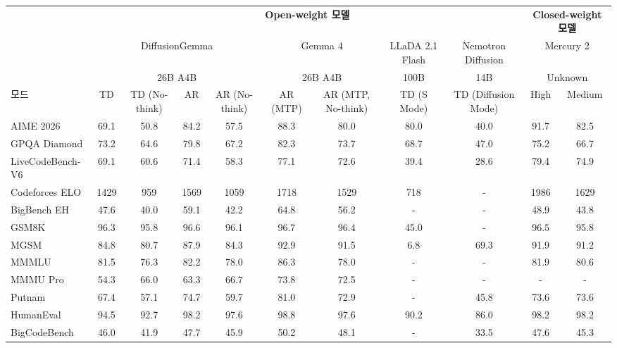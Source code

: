 \documentclass[11pt, a4paper, logo, copyright, gdm]{google}
\begin{document}
\begin{landscape} %

\begin{table}[t!]
\centering
\footnotesize
\setlength{\tabcolsep}{3pt}
\begin{tabular}{lcccccccccc}
\toprule
 & \multicolumn{8}{c}{\textbf{Open-weight 모델}} & \multicolumn{2}{c}{\textbf{Closed-weight 모델}} \\
\cmidrule(r){2-9} \cmidrule(l){10-11}
 & \multicolumn{4}{c}{DiffusionGemma} & \multicolumn{2}{c}{Gemma 4} & LLaDA 2.1 Flash & Nemotron Diffusion & \multicolumn{2}{c}{Mercury 2} \\
 & \multicolumn{4}{c}{26B A4B} & \multicolumn{2}{c}{26B A4B} & 100B & 14B & \multicolumn{2}{c}{Unknown} \\
\cmidrule(r){2-5} \cmidrule(r){6-7} \cmidrule(r){8-8} \cmidrule(r){9-9} \cmidrule(l){10-11}
모드 & TD & TD (No-think) & AR & AR (No-think) & AR (MTP) & AR (MTP, No-think) & TD (S Mode) & TD (Diffusion Mode) & High & Medium \\
\midrule
AIME 2026 & 69.1 & 50.8 & 84.2 & 57.5 & 88.3 & 80.0 & 80.0 & 40.0 & 91.7 & 82.5 \\
GPQA Diamond & 73.2 & 64.6 & 79.8 & 67.2 & 82.3 & 73.7 & 68.7 & 47.0 & 75.2 & 66.7 \\
LiveCodeBench-V6 & 69.1 & 60.6 & 71.4 & 58.3 & 77.1 & 72.6 & 39.4 & 28.6 & 79.4 & 74.9 \\
Codeforces ELO & 1429 & 959 & 1569 & 1059 & 1718 & 1529 & 718 & - & 1986 & 1629 \\
BigBench EH & 47.6 & 40.0 & 59.1 & 42.2 & 64.8 & 56.2 & - & - & 48.9 & 43.8 \\
GSM8K & 96.3 & 95.8 & 96.6 & 96.1 & 96.7 & 96.4 & 45.0 & - & 96.5 & 95.8 \\
MGSM & 84.8 & 80.7 & 87.9 & 84.3 & 92.9 & 91.5 & 6.8 & 69.3 & 91.9 & 91.2 \\
MMMLU & 81.5 & 76.3 & 82.2 & 78.0 & 86.3 & 78.0 & - & - & 81.9 & 80.6 \\
MMMU Pro & 54.3 & 66.0 & 63.3 & 66.7 & 73.8 & 72.5 & - & - & - & - \\
Putnam & 67.4 & 57.1 & 74.7 & 59.7 & 81.0 & 72.9 & - & 45.8 & 73.6 & 73.6 \\
HumanEval & 94.5 & 92.7 & 98.2 & 97.6 & 98.8 & 97.6 & 90.2 & 86.0 & 98.2 & 98.2 \\
BigCodeBench & 46.0 & 41.9 & 47.7 & 45.9 & 50.2 & 48.1 & - & 33.5 & 47.6 & 45.3 \\

\end{tabular}
\end{table}
\end{landscape}
\end{document}
